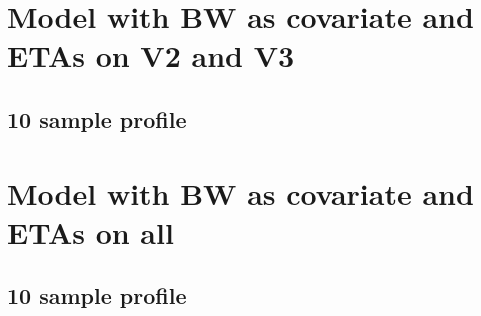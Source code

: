 \section{Model with BW as covariate and ETAs on V2 and V3}
\subsection{10 sample profile}
% 
% 
% 
% 
% 
% 
% 
% 

\section{Model with BW as covariate and ETAs on all}
\subsection{10 sample profile}
% 
% 
% 
% 
% 
% 
% 
% 